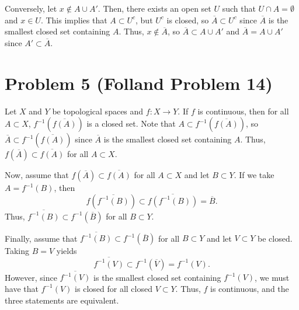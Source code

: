 \documentclass{article}
\begin{document}
Conversely, let $x\notin A\cup A'.$ Then, there exists an open set $U$ such that $U\cap A=\emptyset$ and $x\in U$. This implies that $A\subset U^c$, but $U^c$ is closed, so $\overline A\subset U^c$ since $\overline A$ is the smallest closed set containing $A$. Thus, $x\notin \overline A$, so $\overline A\subset A\cup A'$ and $\overline A= A\cup A'$ since $A'\subset \overline A$.



\section{Problem 5 (Folland Problem 14)}
Let $X$ and $Y$ be topological spaces and $f:X\to Y$. If $f$ is continuous, then for all $A\subset X$, $f^{-1}\left(\overline{f(A)}\right)$ is a closed set. Note that $A\subset f^{-1}\left(\overline{f(A)}\right)$, so $\overline A\subset f^{-1}\left(\overline{f(A)}\right)$ since $\overline A$ is the smallest closed set containing $A$. Thus, $f\left(\overline A\right)\subset \overline{f(A)}$ for all $A\subset X$. 

Now, assume that $f\left(\overline A\right)\subset \overline{f(A)}$ for all $A\subset X$ and let $B\subset Y$. If we take $A=f^{-1}(B)$, then
\[
f\left(\overline{f^{-1}(B)}\right)\subset\overline{f\left(f^{-1}(B)\right)}=\overline B.
\]
Thus, $\overline{f^{-1}(B)}\subset f^{-1}\left(\overline B\right)$ for all $B\subset Y$.

Finally, assume that $\overline{f^{-1}(B)}\subset f^{-1}\left(\overline B\right)$ for all $B\subset Y$ and let $V\subset Y$ be closed. Taking $B=V$ yields 
\[
\overline{f^{-1}(V)}\subset f^{-1}\left(\overline V\right)=f^{-1}(V).
\]
However, since $\overline{f^{-1}(V)}$ is the smallest closed set containing $f^{-1}(V)$, we must have that $f^{-1}(V)$ is closed for all closed $V\subset Y$. Thus, $f$ is continuous, and the three statements are equivalent. 
\end{document}
